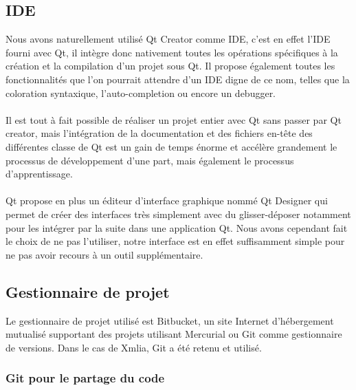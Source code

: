 \subsection{IDE}
Nous avons naturellement utilisé Qt Creator comme IDE, c'est en effet l'IDE fourni avec Qt, il intègre donc nativement toutes les opérations spécifiques à la création et la compilation d'un projet sous Qt. Il propose également toutes les fonctionnalités que l'on pourrait attendre d'un IDE digne de ce nom, telles que la coloration syntaxique, l'auto-completion ou encore un debugger.
\paragraph{}
Il est tout à fait possible de réaliser un projet entier avec Qt sans passer par Qt creator, mais l'intégration de la documentation et des fichiers en-tête des différentes classe de Qt est un gain de temps énorme et accélère grandement le processus de développement d'une part, mais également le processus d'apprentissage.
\paragraph{}
Qt propose en plus un éditeur d'interface graphique nommé Qt Designer qui permet de créer des interfaces très simplement avec du glisser-déposer notamment pour les intégrer par la suite dans une application Qt. Nous avons cependant fait le choix de ne pas l'utiliser, notre interface est en effet suffisamment simple pour ne pas avoir recours à un outil supplémentaire.

\subsection{Gestionnaire de projet}
Le gestionnaire de projet utilisé est Bitbucket, un site Internet d'hébergement mutualisé supportant des projets utilisant Mercurial ou Git comme gestionnaire de versions. Dans le cas de Xmlia, Git a été retenu et utilisé.

\subsubsection{Git pour le partage du code}

